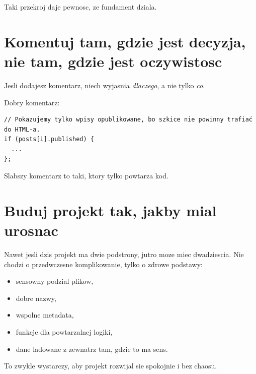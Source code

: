 Taki przekroj daje pewnosc, ze fundament dziala.

\section{Komentuj tam, gdzie jest decyzja, nie tam, gdzie jest oczywistosc}
Jesli dodajesz komentarz, niech wyjasnia \emph{dlaczego}, a nie tylko \emph{co}.

Dobry komentarz:

\begin{lstlisting}[style=moonchunk,caption={Komentarz wyjasniajacy decyzje}]
// Pokazujemy tylko wpisy opublikowane, bo szkice nie powinny trafiać do HTML-a.
if (posts[i].published) {
  ...
};
\end{lstlisting}

Slabszy komentarz to taki, ktory tylko powtarza kod.

\section{Buduj projekt tak, jakby mial urosnac}
Nawet jesli dzis projekt ma dwie podstrony, jutro moze miec dwadziescia. Nie chodzi o
przedwczesne komplikowanie, tylko o zdrowe podstawy:

\begin{itemize}
  \item sensowny podzial plikow,
  \item dobre nazwy,
  \item wspolne metadata,
  \item funkcje dla powtarzalnej logiki,
  \item dane ladowane z zewnatrz tam, gdzie to ma sens.
\end{itemize}

To zwykle wystarczy, aby projekt rozwijal sie spokojnie i bez chaosu.
